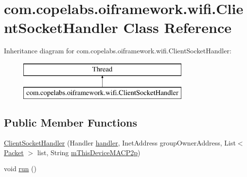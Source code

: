 \hypertarget{classcom_1_1copelabs_1_1oiframework_1_1wifi_1_1_client_socket_handler}{}\section{com.\+copelabs.\+oiframework.\+wifi.\+Client\+Socket\+Handler Class Reference}
\label{classcom_1_1copelabs_1_1oiframework_1_1wifi_1_1_client_socket_handler}
Inheritance diagram for com.\+copelabs.\+oiframework.\+wifi.\+Client\+Socket\+Handler\+:\begin{figure}[H]
\begin{center}
\leavevmode
\includegraphics[height=2.000000cm]{classcom_1_1copelabs_1_1oiframework_1_1wifi_1_1_client_socket_handler}
\end{center}
\end{figure}
\subsection*{Public Member Functions}
\begin{DoxyCompactItemize}
\item 
\hyperlink{classcom_1_1copelabs_1_1oiframework_1_1wifi_1_1_client_socket_handler_a943cf10c4b3b72a7de052a573b98fd1b}{Client\+Socket\+Handler} (Handler \hyperlink{classcom_1_1copelabs_1_1oiframework_1_1wifi_1_1_client_socket_handler_a4184a468a1bc27dc42bf1a671e78d87e}{handler}, Inet\+Address group\+Owner\+Address, List$<$ \hyperlink{classcom_1_1copelabs_1_1oiframework_1_1contentmanager_1_1_packet}{Packet} $>$ list, String \hyperlink{classcom_1_1copelabs_1_1oiframework_1_1wifi_1_1_client_socket_handler_a65203e6b9fafa174ef63042dbbec81b4}{m\+This\+Device\+M\+A\+C\+P2p})
\item 
void \hyperlink{classcom_1_1copelabs_1_1oiframework_1_1wifi_1_1_client_socket_handler_accf19ae0519c0d55611d6a28e9620884}{run} ()
\end{DoxyCompactItemize}
